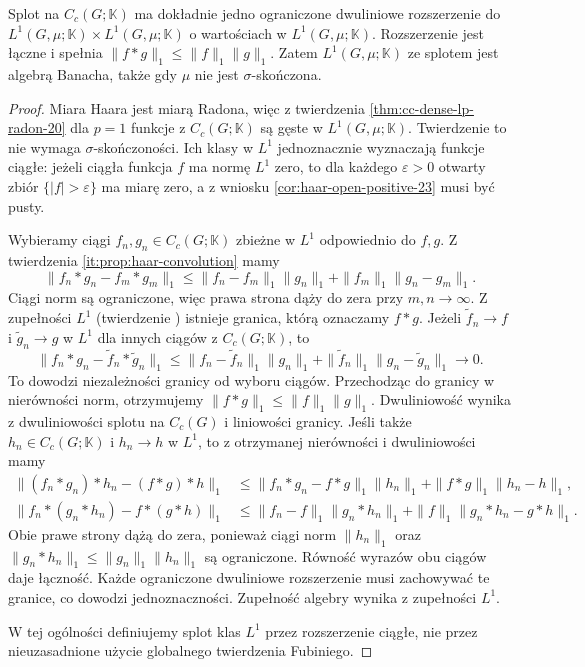 \begin{twierdzenie}
\label{it:thm:haar-l1-convolution}
Splot na $C_c(G;\mathbb K)$ ma dokładnie jedno
ograniczone dwuliniowe rozszerzenie do
$L^1(G,\mu;\mathbb K)\times L^1(G,\mu;\mathbb K)$
o wartościach w $L^1(G,\mu;\mathbb K)$.
Rozszerzenie jest łączne i spełnia
$\|f*g\|_1\le\|f\|_1\|g\|_1$.
Zatem $L^1(G,\mu;\mathbb K)$ ze splotem jest
algebrą Banacha, także gdy $\mu$ nie jest
$\sigma$-skończona.
\end{twierdzenie}
\begin{proof}
Miara Haara jest miarą Radona, więc z twierdzenia
\ref{thm:cc-dense-lp-radon-20} dla $p=1$ funkcje
z $C_c(G;\mathbb K)$ są gęste w $L^1(G,\mu;\mathbb K)$.
Twierdzenie to nie wymaga $\sigma$-skończoności. Ich klasy w $L^1$
jednoznacznie wyznaczają funkcje ciągłe:
jeżeli ciągła funkcja $f$ ma normę $L^1$ zero,
to dla każdego $\varepsilon>0$ otwarty zbiór
$\{|f|>\varepsilon\}$ ma miarę zero, a z wniosku
\ref{cor:haar-open-positive-23} musi być pusty.

Wybieramy ciągi $f_n,g_n\in C_c(G;\mathbb K)$
zbieżne w $L^1$ odpowiednio do $f,g$.
Z twierdzenia \ref{it:prop:haar-convolution}
mamy
\[
 \|f_n*g_n-f_m*g_m\|_1
 \le\|f_n-f_m\|_1\|g_n\|_1+
    \|f_m\|_1\|g_n-g_m\|_1.
\]
Ciągi norm są ograniczone, więc prawa strona
dąży do zera przy $m,n\to\infty$. Z zupełności
$L^1$ (twierdzenie )
istnieje granica, którą oznaczamy $f*g$.
Jeżeli $\widetilde f_n\to f$ i $\widetilde g_n\to g$
w $L^1$ dla innych ciągów z $C_c(G;\mathbb K)$, to
\[
 \|f_n*g_n-\widetilde f_n*\widetilde g_n\|_1
 \le \|f_n-\widetilde f_n\|_1\|g_n\|_1
   +\|\widetilde f_n\|_1\|g_n-\widetilde g_n\|_1
 \longrightarrow0.
\]
To dowodzi niezależności granicy od wyboru ciągów. Przechodząc do granicy
w nierówności norm, otrzymujemy
$\|f*g\|_1\le\|f\|_1\|g\|_1$.
Dwuliniowość wynika z dwuliniowości splotu
na $C_c(G)$ i liniowości granicy.
Jeśli także $h_n\in C_c(G;\mathbb K)$ i $h_n\to h$ w $L^1$,
to z otrzymanej nierówności i dwuliniowości mamy
\begin{align*}
 \|(f_n*g_n)*h_n-(f*g)*h\|_1
 &\le\|f_n*g_n-f*g\|_1\|h_n\|_1
   +\|f*g\|_1\|h_n-h\|_1,\\
 \|f_n*(g_n*h_n)-f*(g*h)\|_1
 &\le\|f_n-f\|_1\|g_n*h_n\|_1
   +\|f\|_1\|g_n*h_n-g*h\|_1.
\end{align*}
Obie prawe strony dążą do zera, ponieważ ciągi norm
$\|h_n\|_1$ oraz $\|g_n*h_n\|_1\le\|g_n\|_1\|h_n\|_1$
są ograniczone.
Równość wyrazów obu ciągów daje łączność.
Każde ograniczone dwuliniowe rozszerzenie
musi zachowywać te granice, co dowodzi
jednoznaczności. Zupełność algebry wynika
z zupełności $L^1$.

W tej ogólności definiujemy splot klas $L^1$
przez rozszerzenie ciągłe, nie przez nieuzasadnione
użycie globalnego twierdzenia Fubiniego.
\end{proof}

